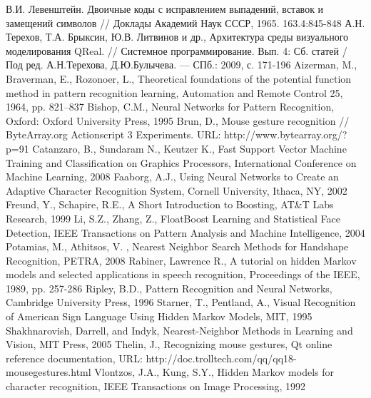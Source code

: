 \documentclass[a5paper]{article}
\begin{document}
\begin{thebibliography}{9001}
   В.И. Левенштейн. Двоичные коды с исправлением выпадений, вставок и замещений символов // Доклады Академий Наук СССР, 1965. 163.4:845-848
   А.Н. Терехов, Т.А. Брыксин, Ю.В. Литвинов и др., Архитектура среды визуального моделирования QReal. // Системное 
программирование. Вып. 4: Сб. статей / Под ред. А.Н.Терехова, Д.Ю.Булычева. --- СПб.: 2009, с. 171-196
   Aizerman, M., Braverman, E., Rozonoer, L., Theoretical foundations of the potential function method in pattern recognition learning, 
Automation and Remote Control 25, 1964, pp. 821–837
   Bishop, C.M., Neural Networks for Pattern Recognition, Oxford: Oxford University Press, 1995  
   Brun, D., Mouse gesture recognition // ByteArray.org Actionscript 3 Experiments. URL: http://www.bytearray.org/?p=91 
   Catanzaro, B., Sundaram N., Keutzer K., Fast Support Vector Machine Training and Classification on Graphics Processors, International 
Conference on Machine Learning, 2008
   Faaborg, A.J., Using Neural Networks to Create an Adaptive Character Recognition System, Cornell University, Ithaca, NY, 2002
   Freund, Y., Schapire, R.E., A Short Introduction to Boosting, AT\&T Labs Research, 1999
   Li, S.Z., Zhang, Z., FloatBoost Learning and Statistical Face Detection, IEEE Transactions on Pattern Analysis and Machine Intelligence, 2004
   Potamias, M., Athitsos, V. , Nearest Neighbor Search Methods for Handshape Recognition, PETRA, 2008
   Rabiner, Lawrence R., A tutorial on hidden Markov models and selected applications in speech recognition, Proceedings of the IEEE, 1989, pp. 257-286
   Ripley, B.D., Pattern Recognition and Neural Networks, Cambridge University Press, 1996
   Starner, T., Pentland, A., Visual Recognition of American Sign Language Using Hidden Markov Models, MIT, 1995
   Shakhnarovish, Darrell, and Indyk, Nearest-Neighbor Methods in Learning and Vision, MIT Press, 2005
   Thelin, J., Recognizing mouse gestures, Qt online reference documentation, URL: http://doc.trolltech.com/qq/qq18-mousegestures.html 
   Vlontzos, J.A., Kung, S.Y., Hidden Markov models for character recognition, IEEE Transactions on Image Processing, 1992
\end{thebibliography}
  
\end{document}
